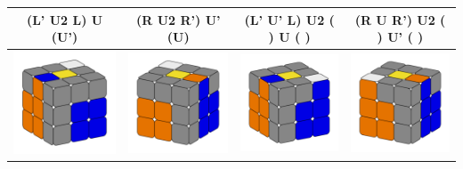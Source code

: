 \documentclass[12pt, a3paper]{article}
\newcommand{\scale}{1}
\begin{document}
\begin{center}
\begin{longtable}{c|c||c|c}
	(L' U2 L) U (U') & (R U2 R') U' (U) & (L' U' L) U2 ( ) U ( ) & (R U R') U2 ( ) U' ( ) \\
	\hline
	\hline
	\includegraphics[scale=\scale]{13l} & \includegraphics[scale=\scale]{13r}  &  \includegraphics[scale=\scale]{14l} & \includegraphics[scale=\scale]{14r} \\

\end{longtable}
\end{center}
\end{document}
